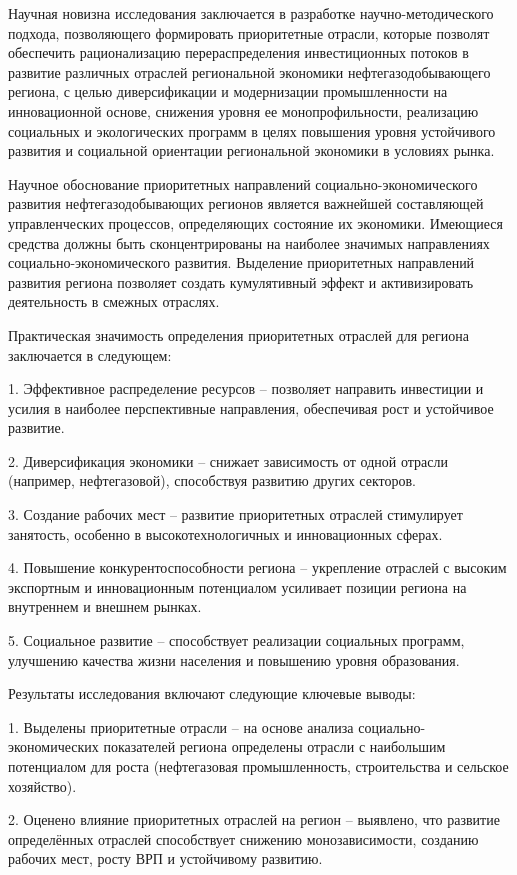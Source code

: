 Научная новизна исследования заключается в разработке
научно-методического подхода, позволяющего формировать приоритетные
отрасли, которые позволят обеспечить рационализацию перераспределения
инвестиционных потоков в развитие различных отраслей региональной
экономики нефтегазодобывающего региона, с целью диверсификации и
модернизации промышленности на инновационной основе, снижения уровня ее
монопрофильности, реализацию социальных и экологических программ в целях
повышения уровня устойчивого развития и социальной ориентации
региональной экономики в условиях рынка.

Научное обоснование приоритетных направлений социально-экономического
развития нефтегазодобывающих регионов является важнейшей составляющей
управленческих процессов, определяющих состояние их экономики. Имеющиеся
средства должны быть сконцентрированы на наиболее значимых направлениях
социально-экономического развития. Выделение приоритетных направлений
развития региона позволяет создать кумулятивный эффект и активизировать
деятельность в смежных отраслях.

Практическая значимость определения приоритетных отраслей для региона
заключается в следующем:

1. Эффективное распределение ресурсов -- позволяет направить инвестиции
и усилия в наиболее перспективные направления, обеспечивая рост и
устойчивое развитие.

2. Диверсификация экономики -- снижает зависимость от одной отрасли
(например, нефтегазовой), способствуя развитию других секторов.

3. Создание рабочих мест -- развитие приоритетных отраслей стимулирует
занятость, особенно в высокотехнологичных и инновационных сферах.

4. Повышение конкурентоспособности региона -- укрепление отраслей с
высоким экспортным и инновационным потенциалом усиливает позиции региона
на внутреннем и внешнем рынках.

5. Социальное развитие -- способствует реализации социальных программ,
улучшению качества жизни населения и повышению уровня образования.

Результаты исследования включают следующие ключевые выводы:

1. Выделены приоритетные отрасли -- на основе анализа
социально-экономических показателей региона определены отрасли с
наибольшим потенциалом для роста (нефтегазовая промышленность,
строительства и сельское хозяйство).

2. Оценено влияние приоритетных отраслей на регион -- выявлено, что
развитие определённых отраслей способствует снижению монозависимости,
созданию рабочих мест, росту ВРП и устойчивому развитию.

